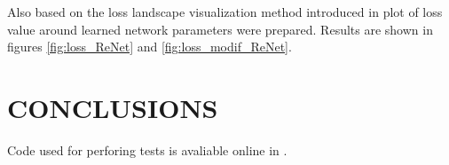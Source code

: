 \documentclass[a4paper, 10 pt, conference]{ieeeconf}
\begin{document}
Also based on the loss landscape visualization method introduced in \cite{DBLP:journals/corr/abs-1712-09913} plot of loss value around learned network parameters were prepared. Results are shown in figures \ref{fig:loss_ReNet} and \ref{fig:loss_modif_ReNet}.

\section{CONCLUSIONS}


Code used for perforing tests is avaliable online in \cite{repo}.




\end{document}
